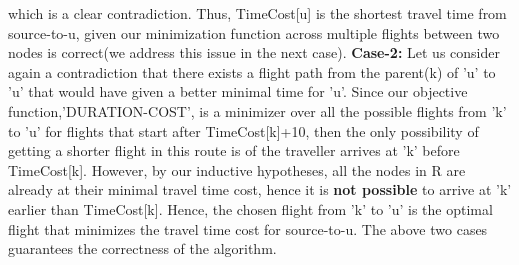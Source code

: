 \documentclass{article}
\begin{document}
  which is a clear contradiction. Thus, TimeCost[u] is the shortest travel time from source-to-u, given our minimization function across multiple flights between two nodes is correct(we address this issue in the next case).  \newline
  \textbf {Case-2:} Let us consider again a contradiction that there exists a flight path from the parent(k) of 'u' to 'u' that would have given a better minimal time for 'u'. Since our objective function,'DURATION-COST', is a minimizer over all the possible flights from 'k' to 'u' for flights that start after TimeCost[k]+10, then the only possibility of getting a shorter flight in this route is of the traveller arrives at 'k' before TimeCost[k]. However, by our inductive hypotheses, all the nodes in R are already at their minimal travel time cost, hence it is \textbf {not possible} to arrive at 'k' earlier than TimeCost[k]. Hence, the chosen flight from 'k' to 'u' is the optimal flight that minimizes the travel time cost for source-to-u. \newline
  The above two cases guarantees the correctness of the algorithm. \newline
\end{document}
